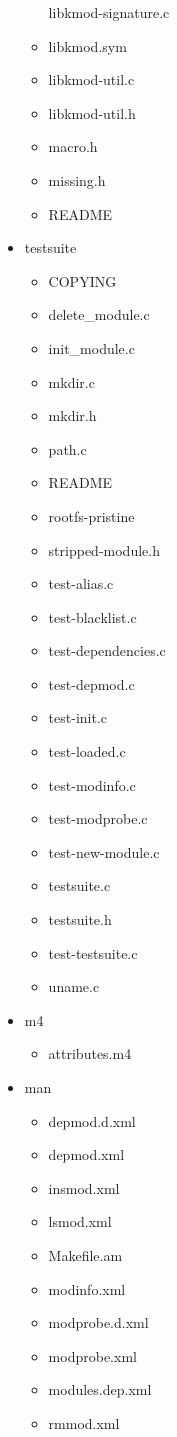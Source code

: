 \begin{itemize}
\begin{itemize}
    libkmod-signature.c
  \item
    libkmod.sym
  \item
    libkmod-util.c
  \item
    libkmod-util.h
  \item
    macro.h
  \item
    missing.h
  \item
    README
  \end{itemize}
\item
  testsuite
  \begin{itemize}
  \item
    COPYING
  \item
    delete\_module.c
  \item
    init\_module.c
  \item
    mkdir.c
  \item
    mkdir.h
  \item
    path.c
  \item
    README
  \item
    rootfs-pristine
  \item
    stripped-module.h
  \item
    test-alias.c
  \item
    test-blacklist.c
  \item
    test-dependencies.c
  \item
    test-depmod.c
  \item
    test-init.c
  \item
    test-loaded.c
  \item
    test-modinfo.c
  \item
    test-modprobe.c
  \item
    test-new-module.c
  \item
    testsuite.c
  \item
    testsuite.h
  \item
    test-testsuite.c
  \item
    uname.c
  \end{itemize}
\item
  m4
  \begin{itemize}
  \item
    attributes.m4
  \end{itemize}
\item
  man
  \begin{itemize}
  \item
    depmod.d.xml
  \item
    depmod.xml
  \item
    insmod.xml
  \item
    lsmod.xml
  \item
    Makefile.am
  \item
    modinfo.xml
  \item
    modprobe.d.xml
  \item
    modprobe.xml
  \item
    modules.dep.xml
  \item
    rmmod.xml
  \end{itemize}
\end{itemize}
